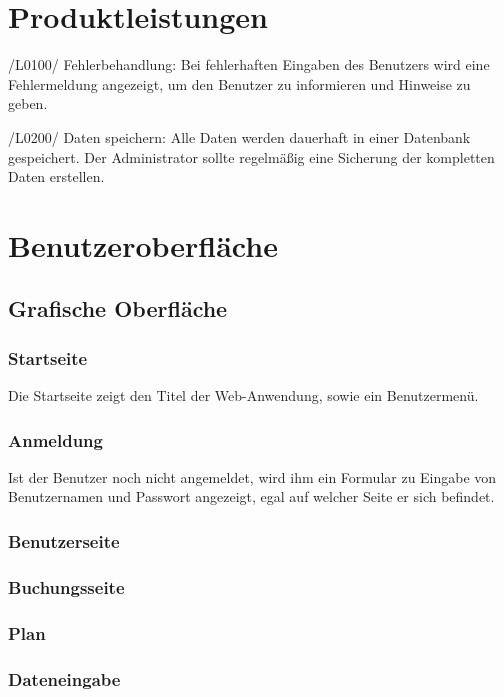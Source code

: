 \documentclass[a4paper,oneside]{scrreprt}
\begin{document}
\chapter{Produktleistungen}
/L0100/ Fehlerbehandlung: 
Bei fehlerhaften Eingaben des Benutzers wird eine Fehlermeldung angezeigt, um den Benutzer zu informieren und Hinweise zu geben.

/L0200/ Daten speichern: 
Alle Daten werden dauerhaft in einer Datenbank gespeichert. Der Administrator sollte regelmäßig eine Sicherung der kompletten Daten erstellen.


\chapter{Benutzeroberfläche}

\section{Grafische Oberfläche}

\subsection*{Startseite}

Die Startseite zeigt den Titel der Web-Anwendung, sowie ein Benutzermenü. 

\subsection*{Anmeldung}

Ist der Benutzer noch nicht angemeldet, wird ihm ein Formular zu Eingabe von Benutzernamen und Passwort angezeigt, egal auf welcher Seite er sich befindet.

\subsection*{Benutzerseite}
\subsection*{Buchungsseite}
\subsection*{Plan}
\subsection*{Dateneingabe}
\end{document}
